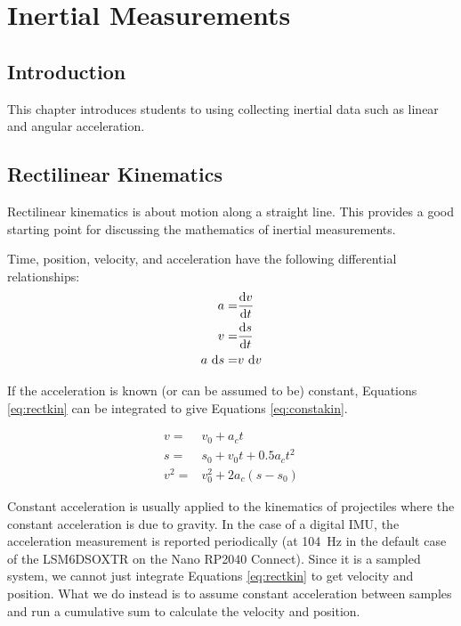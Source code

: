 \chapter{Inertial Measurements}

\section{Introduction}
This chapter introduces students to using collecting inertial data such as
linear and angular acceleration.

\section{Rectilinear Kinematics}
Rectilinear kinematics is about motion along a straight line. This provides a good starting point for 
discussing the mathematics of inertial measurements. 

Time, position, velocity, and acceleration have the following differential relationships:
\begin{subequations}
	\label{eq:rectkin}
	\begin{align}
		a = & \dv{v}{t} \\
		v = & \dv{s}{t} \\
		a \ \dd s = & v\  \dd v
	\end{align}
	
\end{subequations}

If the acceleration is known (or can be assumed to be) constant, Equations \ref{eq:rectkin} can be
integrated to give Equations \ref{eq:constakin}.

\begin{subequations}
	\label{eq:constakin}
	\begin{align}
		v = & v_0 + a_ct \\
		s = & s_0 + v_0t + 0.5a_ct^2 \\
		v^2 = & v_0^2 + 2a_c(s - s_0)
	\end{align}
\end{subequations}

Constant acceleration is usually applied to the kinematics of projectiles where the constant acceleration
is due to gravity. In the case of a digital IMU, the acceleration measurement is reported periodically 
(at 104~Hz in the default case of the LSM6DSOXTR on the Nano RP2040 Connect). Since it is a sampled system,
we cannot just integrate Equations \ref{eq:rectkin} to get velocity and position. What we do instead is to
assume constant acceleration between samples and run a cumulative sum to calculate the velocity and position.

